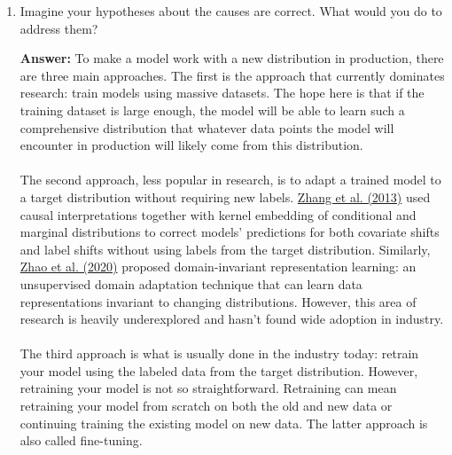 \documentclass{article}
\newenvironment{QandA}{\begin{enumerate}[label=\arabic*.]}{\end{enumerate}}
\newenvironment{InnerQandA}{\begin{enumerate}[label=\roman*.]}{\end{enumerate}}
\newenvironment{answer}{\par\normalfont \textbf{Answer:}}{}
\begin{document}
\begin{QandA}
\begin{InnerQandA}
\begin{answer}
            When dealing with temporal shifts, the time scale window of the data we look at affects the shifts we can detect. If your data has a weekly cycle, then a time scale of less than a week won’t detect the cycle. Therefore, by setting the time window too small, your detection technique can produce a false alarm simply due to the seasonality inherent to the data. \\\\
            When computing running statistics over time, it’s important to differentiate between cumulative and sliding statistics. Sliding statistics are computed within a single time scale window, e.g. an hour. Cumulative statistics are continually updated with more data. This means for each beginning of a time scale window, the sliding accuracy is reset, whereas the cumulative sliding accuracy is not. Because cumulative statistics contain information from previous time windows, they might obscure what happens in a specific time window. 
        \end{answer}

        \item Imagine your hypotheses about the causes are correct. What would you do to address them?
        \begin{answer}
            To make a model work with a new distribution in production, there are three main approaches. The first is the approach that currently dominates research: train models using massive datasets. The hope here is that if the training dataset is large enough, the model will be able to learn such a comprehensive distribution that whatever data points the model will encounter in production will likely come from this distribution. \\\\
            The second approach, less popular in research, is to adapt a trained model to a target distribution without requiring new labels. \href{http://proceedings.mlr.press/v28/zhang13d.pdf}{Zhang et al. (2013)} used causal interpretations together with kernel embedding of conditional and marginal distributions to correct models’ predictions for both covariate shifts and label shifts without using labels from the target distribution. Similarly, \href{http://proceedings.mlr.press/v97/zhao19a.html}{Zhao et al. (2020)} proposed domain-invariant representation learning: an unsupervised domain adaptation technique that can learn data representations invariant to changing distributions. However, this area of research is heavily underexplored and hasn’t found wide adoption in industry. \\\\
            The third approach is what is usually done in the industry today: retrain your model using the labeled data from the target distribution. However, retraining your model is not so straightforward. Retraining can mean retraining your model from scratch on both the old and new data or continuing training the existing model on new data. The latter approach is also called fine-tuning.
        \end{answer}


\end{InnerQandA}
\end{QandA}
\end{document}
